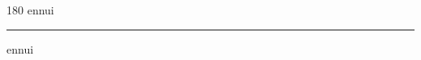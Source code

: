 
\begin{frame}
\begin{center}
\begin{turn}{180}
{\fontsize{2.5cm}{1em}\selectfont ennui}
\end{turn}
\vspace{1em}\par  
\hrule
\vspace{1em}\par  
{\fontsize{2.5cm}{1em}\selectfont ennui}
\end{center}
\end{frame}
